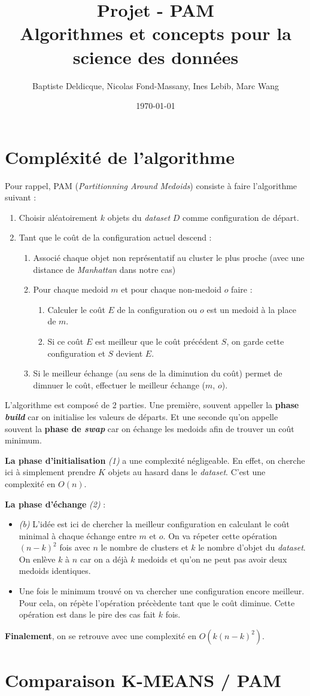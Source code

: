 \documentclass[11pt]{article}
\author{Baptiste Deldicque, Nicolas Fond-Massany, Ines Lebib, Marc Wang}
\date{\today}
\title{Projet - PAM\\\medskip
\large Algorithmes et concepts pour la science des données}
\begin{document}
\maketitle

\section{Compléxité de l'algorithme}
\label{sec:org72678a8}
Pour rappel, PAM (\emph{Partitionning Around Medoids}) consiste à faire l'algorithme suivant :
\begin{enumerate}
\item Choisir aléatoirement \(k\) objets du \emph{dataset} \(D\) comme configuration de départ.
\item Tant que le coût de la configuration actuel descend :
\begin{enumerate}
\item Associé chaque objet non représentatif au cluster le plus proche (avec une distance de \emph{Manhattan} dans notre cas)
\item Pour chaque medoid \(m\) et pour chaque non-medoid \(o\) faire :
\begin{enumerate}
\item Calculer le coût \(E\) de la configuration ou \(o\) est un medoid à la place de \(m\).
\item Si ce coût \(E\) est meilleur que le coût précédent \(S\), on garde cette configuration et \(S\) devient \(E\).
\end{enumerate}
\item Si le meilleur échange (au sens de la diminution du coût) permet de dimnuer le coût, effectuer le meilleur échange (\(m\), \(o\)).
\end{enumerate}
\end{enumerate}

L'algorithme est composé de 2 parties. Une première, souvent appeller la \textbf{phase \emph{build}} car on initialise les valeurs de départs. Et une seconde qu'on appelle souvent la \textbf{phase de \emph{swap}} car on échange les medoids afin de trouver un coût minimum.

\textbf{La phase d'initialisation} \emph{(1)} a une complexité négligeable. En effet, on cherche ici à simplement prendre \(K\) objets au hasard dans le \emph{dataset}. C'est une complexité en \(O(n)\).

\textbf{La phase d'échange} \emph{(2)} :
\begin{itemize}
\item \emph{(b)} L'idée est ici de chercher la meilleur configuration en calculant le coût minimal à chaque échange entre \(m\) et \(o\). On va répeter cette opération \((n-k)^2\) fois avec \(n\) le nombre de clusters et \(k\) le nombre d'objet du \emph{dataset}. On enlève \(k\) à \(n\) car on a déjà \(k\) medoids et qu'on ne peut pas avoir deux medoids identiques.
\item Une fois le minimum trouvé on va chercher une configuration encore meilleur. Pour cela, on répète l'opération précèdente tant que le coût diminue. Cette opération est dans le pire des cas fait \(k\) fois.
\end{itemize}

\textbf{Finalement}, on se retrouve avec une complexité en \(O(k(n-k)^2)\).

\section{Comparaison K-MEANS / PAM}
\label{sec:orge23279c}
\end{document}
